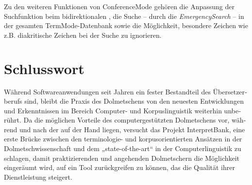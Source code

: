 \documentclass[output=paper]{LSP/langsci}
\begin{document}
\begin{otherlanguage}{ngerman}
Zu den weiteren Funktionen von ConferenceMode gehören die Anpassung der Suchfunktion beim bidirektionalen , die Suche -- durch die \textit{EmergencySearch} -- in der gesamten TermMode-Datenbank sowie die Möglichkeit, besondere Zeichen wie z.B. diakritische Zeichen bei der Suche zu ignorieren.

\section{Schlusswort}\label{sec:fantinuoli:7}

Während Softwareanwendungen seit Jahren ein fester Bestandteil des Übersetzerberufs sind, bleibt die Praxis des Dolmetschens von den neuesten Entwicklungen und Erkenntnissen im Bereich Computer- und Korpuslinguistik weiterhin unberührt. Da die möglichen Vorteile des computergestützten Dolmetschens vor, während und nach der  auf der Hand liegen, versucht das Projekt InterpretBank, eine erste Brücke zwischen den terminologie- und korpusorientierten Ansätzen in der Dolmetschwissenschaft und dem „state-of-the-art“ in der Computerlinguistik zu schlagen, damit praktizierenden und angehenden Dolmetschern die Möglichkeit eingeräumt wird, auf ein Tool zurückgreifen zu können, das die Qualität ihrer Dienstleistung steigert. 

\end{otherlanguage}
{\sloppy 
\printbibliography[heading=subbibliography,notkeyword=this]
}
\end{document}
